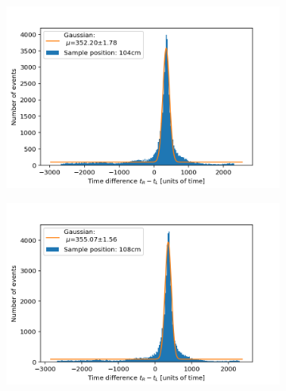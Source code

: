 \documentclass[]{article}
\begin{document}
\begin{figure}[H]
\medskip
\begin{subfigure}{0.48\textwidth}
\includegraphics[width=\linewidth]{Plots/Pos/104cm.png}
\end{subfigure}
\begin{subfigure}[c]{0.48\linewidth}
\includegraphics[width=\linewidth]{Plots/Pos/108cm.png}
\end{subfigure}


\end{figure}
\end{document}
